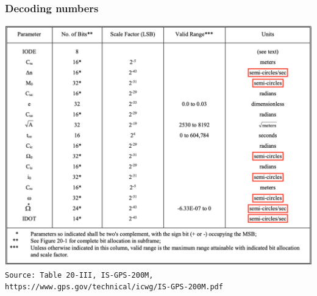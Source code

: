 \documentclass[aspectratio=169, xcolor=table]{beamer}
\begin{document}
\begin{frame}
    \frametitle{Decoding numbers}

    \centering
    \includegraphics[width=\textwidth * 11 / 20]{15 numbers semi-circles.png} \\
    \texttt{\tiny{Source: Table 20-III, IS-GPS-200M, https://www.gps.gov/technical/icwg/IS-GPS-200M.pdf}}
\end{frame}
\end{document}
